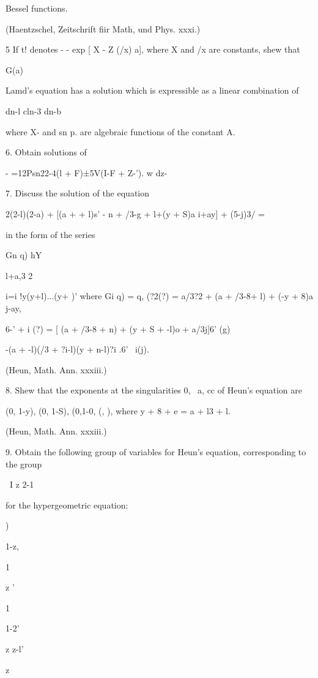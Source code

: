 {{{{{{{{Bessel functions.

(Haentzschel, Zeitschrift fiir Math, und Phys. xxxi.)

5 If t! denotes - - exp [ X - Z (/x) a], where X and /x are constants,
shew that

G(a)

Lamd's equation has a solution which is expressible as a linear
combination of

dn-l cln-3 dn-b

where X- and sn p. are algebraic functions of the constant A.


6. Obtain solutions of

- =12Psn22-4(l + F)±5V(I-F + Z-'). w dz-


7. Discuss the solution of the equation

2(2-l)(2-a) + [(a + + l)s' - n + /3-g + l+(y + S)a i+ay] + (5-j)3/ =

in the form of the series

Gn q) hY

l+a,3 2

i=i !y(y+l)...(y+ )' where Gi q) = q, (?2(?) = a/3?2 + (a + /3-8+ l) +
(-y + 8)a j-ay,

6-' + i (?) = [ (a + /3-8 + n) + (y + S + -l)o + a/3j]6' (g)

-(a + -l)(/3 + ?i-l)(y + n-l)?i .6' \ i(j).

(Heun, Math. Ann. xxxiii.)

%
%

8. Shew that the exponents at the singularities 0, \, a, cc of Heun's
equation are

(0, 1-y), (0, 1-S), (0,1-0, (, ), where y + 8 + e = a + l3 + l.

(Heun, Math. Ann. xxxiii.)

9. Obtain the following group of variables for Heun's equation,
corresponding to the group

\ I z 2-1

for the hypergeometric equation:

 )

1-z,

1

z '

1

1-2'

z z-l'

z

}}}}}}}}
